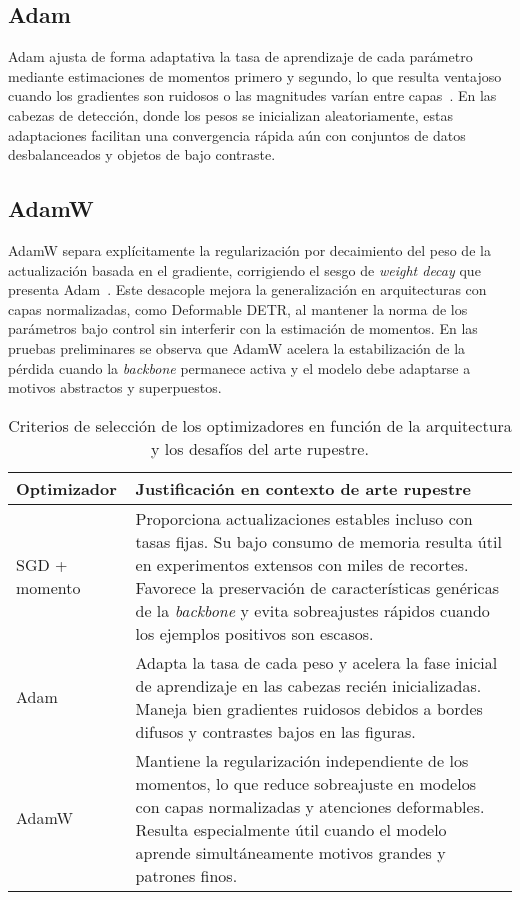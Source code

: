 \subsection*{Adam}
Adam ajusta de forma adaptativa la tasa de aprendizaje de cada parámetro mediante estimaciones de momentos primero y segundo, lo que resulta ventajoso cuando los gradientes son ruidosos o las magnitudes varían entre capas~\cite{kingma2015adam}.
En las cabezas de detección, donde los pesos se inicializan aleatoriamente, estas adaptaciones facilitan una convergencia rápida aún con conjuntos de datos desbalanceados y objetos de bajo contraste.

\subsection*{AdamW}
AdamW separa explícitamente la regularización por decaimiento del peso de la actualización basada en el gradiente, corrigiendo el sesgo de \emph{weight decay} que presenta Adam~\cite{loshchilov2019adamw}.
Este desacople mejora la generalización en arquitecturas con capas normalizadas, como Deformable DETR, al mantener la norma de los parámetros bajo control sin interferir con la estimación de momentos.
En las pruebas preliminares se observa que AdamW acelera la estabilización de la pérdida cuando la \emph{backbone} permanece activa y el modelo debe adaptarse a motivos abstractos y superpuestos.

\begin{table}[h]
    \centering
    \begin{tabular}{l p{10.2cm}}
        \hline
        \textbf{Optimizador} & \textbf{Justificación en contexto de arte rupestre} \\
        \hline
        SGD + momento & Proporciona actualizaciones estables incluso con tasas fijas. Su bajo consumo de memoria resulta útil en experimentos extensos con miles de recortes.
        Favorece la preservación de características genéricas de la \emph{backbone} y evita sobreajustes rápidos cuando los ejemplos positivos son escasos. \\[0.3em]
        Adam & Adapta la tasa de cada peso y acelera la fase inicial de aprendizaje en las cabezas recién inicializadas.
        Maneja bien gradientes ruidosos debidos a bordes difusos y contrastes bajos en las figuras. \\[0.3em]
        AdamW & Mantiene la regularización independiente de los momentos, lo que reduce sobreajuste en modelos con capas normalizadas y atenciones deformables.
        Resulta especialmente útil cuando el modelo aprende simultáneamente motivos grandes y patrones finos. \\
    \end{tabular}
    \caption{Criterios de selección de los optimizadores en función de la arquitectura y los desafíos del arte rupestre.}
    \label{tab:optimizadores}
\end{table}

